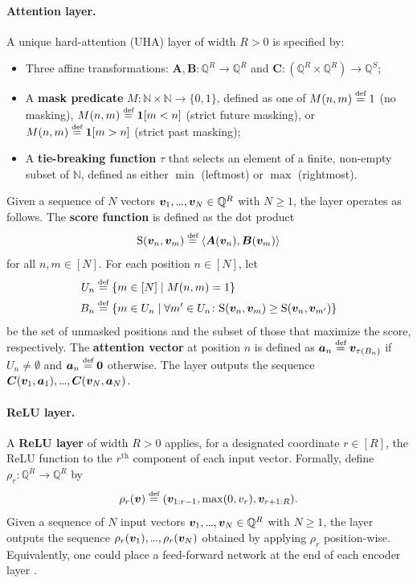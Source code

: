 \documentclass{article} %
\newcommand{\Q}{\mathbb{Q}}
\newcommand{\N}{\mathbb{N}}
\newcommand{\score}{\mathrm{S}}
\newcommand{\defeq}{\mathrel{\stackrel{\textnormal{\tiny def}}{=}}}
\newcommand{\indicator}[1]{\mathbf{1}\!\left[#1\right]}
\newcommand{\defn}[1]{\textbf{#1}}
\newcommand{\matA}{\boldsymbol{A}}
\newcommand{\matB}{\boldsymbol{B}}
\newcommand{\matC}{\boldsymbol{C}}
\newcommand{\veca}{\boldsymbol{a}}
\newcommand{\bv}{\boldsymbol{v}}
\newcommand{\mydots}{%
  \ifmmode
    \mathord{.}\mkern-1mu\mathord{.}\mkern-1mu\mathord{.}%
  \else
    .\kern-0.1em.\kern-0.1em.%
  \fi
}
\renewcommand{\ldots}{\mydots}%
\renewcommand{\dots}{\mydots}%
\begin{document}
\paragraph{Attention layer.}
A unique hard-attention (UHA) layer of width $R > 0$ is
specified by:
\begin{itemize}[itemsep=1pt, topsep=2pt, parsep=0pt, leftmargin=2em]
    \item Three affine transformations: $\matA, \matB \colon \Q^R \to \Q^R$ and
    $\matC \colon (\Q^{R} \times \Q^{R}) \to \Q^S$;
    \item A \defn{mask predicate} $M \colon \N \times \N \to
    \{0,1\}$, defined as one of $M(n,m) \defeq 1$ (no masking),
    $M(n,m) \defeq \indicator{m < n}$ (strict future masking), or $M(n,m) \defeq \indicator{m > n}$
    (strict past masking);
    \item A \defn{tie-breaking function} $\tau$ that selects an element
    of a finite, non-empty subset of $\N$, defined as either $\min$
    (leftmost) or $\max$ (rightmost).
\end{itemize}
Given a sequence of $N$ vectors $\bv_1,\ldots,\bv_N \in \Q^R$ with $N \ge 1$,
the layer operates as follows.
The \defn{score function} is defined as the dot
product
\begin{equation}\label{eq:uha-score}
    \score(\bv_n,\bv_m) \defeq \langle \matA(\bv_n), \matB(\bv_m) \rangle
\end{equation}
for all $n,m \in [N]$. For each position $n \in [N]$, let
\begin{subequations}\label{eq:uha-attended}
\begin{align}
\label{eq:uha-attended-U}
U_n &\defeq \{m \in [N] \mid M(n, m) = 1\} \\
\label{eq:uha-attended-B}
B_n &\defeq \{m \in U_n \mid \forall m' \in U_n \colon \score(\bv_n,\bv_m) \ge \score(\bv_n,\bv_{m'})\}
\end{align}
\end{subequations}
be the set of unmasked positions and the subset of those that maximize the
score, respectively. The \defn{attention vector} at position $n$ is defined as $\veca_n \defeq \bv_{\tau(B_n)}$ if $U_n \ne \emptyset$ and $\veca_n \defeq \mathbf{0}$
otherwise. The layer outputs the sequence $\matC(\bv_1, \veca_1), \dots,
\matC(\bv_N, \veca_N)$.

\paragraph{ReLU layer.}
A \defn{ReLU layer} of width $R > 0$ applies, for a designated coordinate
$r \in [R]$, the ReLU function to the $r^{\text{th}}$ component of each input
vector. 
Formally, define $\rho_r \colon \Q^R \to \Q^R$ by
\begin{equation}\label{eq:relu-layer-vec}
\rho_r(\bv) \defeq (\bv_{1:r-1}, \max(0, v_r), \bv_{r+1:R}).
\end{equation}
Given a sequence of $N$ input vectors $\bv_1,\ldots,\bv_N \in \Q^R$ with $N \ge 1$, the layer outputs the sequence $\rho_r(\bv_1),\ldots,\rho_r(\bv_N)$ obtained by applying $\rho_r$ position-wise.
Equivalently, one could place a
feed-forward network at the end of each encoder layer \citep{Hao22,barcelo2024logical}.
\end{document}
